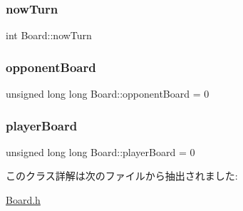 \subsubsection{\texorpdfstring{now\+Turn}{nowTurn}}
{\footnotesize\ttfamily int Board\+::now\+Turn}

\mbox{\label{class_board_a4bfa03bee32336269f5d9d2d259a1d1f}} 
\subsubsection{\texorpdfstring{opponent\+Board}{opponentBoard}}
{\footnotesize\ttfamily unsigned long long Board\+::opponent\+Board = 0}

\mbox{\label{class_board_a3f5dd6aed9346e21df3ad7a49eb4aa33}} 
\subsubsection{\texorpdfstring{player\+Board}{playerBoard}}
{\footnotesize\ttfamily unsigned long long Board\+::player\+Board = 0}



このクラス詳解は次のファイルから抽出されました\+:\begin{DoxyCompactItemize}
\item 
\mbox{\hyperlink{_board_8h}{Board.\+h}}\end{DoxyCompactItemize}

